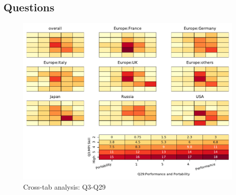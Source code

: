
\subsection{Questions}


\begin{figure}
\begin{center}
\includegraphics[width=12cm]{../pdfs/Q3-Q29.pdf}
\caption{Cross-tab analysis: Q3-Q29}
\label{fig:Q3-Q29}
\end{center}
\end{figure}

